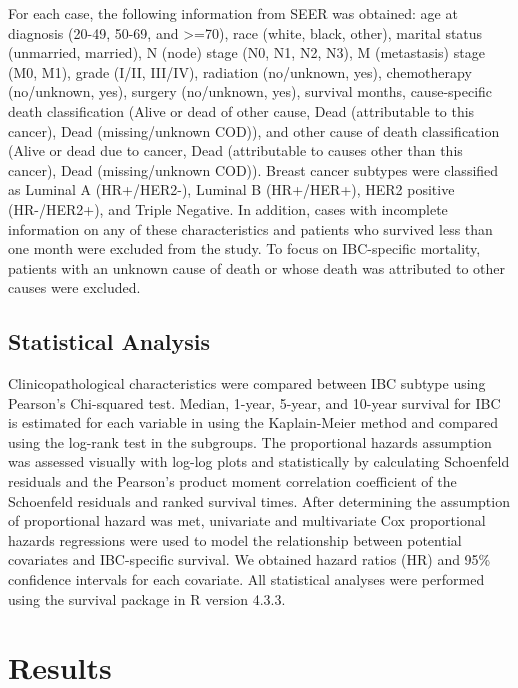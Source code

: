 \documentclass[
  letterpaper,
  DIV=11,
  numbers=noendperiod]{scrartcl}
\begin{document}
For each case, the following information from SEER was obtained: age at
diagnosis (20-49, 50-69, and \textgreater=70), race (white, black,
other), marital status (unmarried, married), N (node) stage (N0, N1, N2,
N3), M (metastasis) stage (M0, M1), grade (I/II, III/IV), radiation
(no/unknown, yes), chemotherapy (no/unknown, yes), surgery (no/unknown,
yes), survival months, cause-specific death classification (Alive or
dead of other cause, Dead (attributable to this cancer), Dead
(missing/unknown COD)), and other cause of death classification (Alive
or dead due to cancer, Dead (attributable to causes other than this
cancer), Dead (missing/unknown COD)). Breast cancer subtypes were
classified as Luminal A (HR+/HER2-), Luminal B (HR+/HER+), HER2 positive
(HR-/HER2+), and Triple Negative. In addition, cases with incomplete
information on any of these characteristics and patients who survived
less than one month were excluded from the study. To focus on
IBC-specific mortality, patients with an unknown cause of death or whose
death was attributed to other causes were excluded.

\subsection{Statistical Analysis}\label{statistical-analysis}

Clinicopathological characteristics were compared between IBC subtype
using Pearson's Chi-squared test. Median, 1-year, 5-year, and 10-year
survival for IBC is estimated for each variable in using the
Kaplain-Meier method and compared using the log-rank test in the
subgroups. The proportional hazards assumption was assessed visually
with log-log plots and statistically by calculating Schoenfeld residuals
and the Pearson's product moment correlation coefficient of the
Schoenfeld residuals and ranked survival times. After determining the
assumption of proportional hazard was met, univariate and multivariate
Cox proportional hazards regressions were used to model the relationship
between potential covariates and IBC-specific survival. We obtained
hazard ratios (HR) and 95\% confidence intervals for each covariate. All
statistical analyses were performed using the survival package in R
version 4.3.3.

\clearpage

\section{Results}\label{results}
\end{document}
